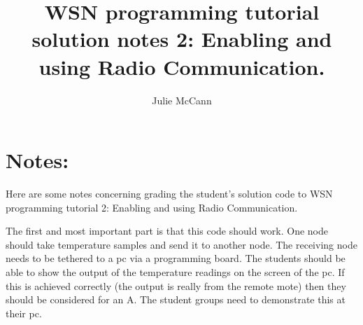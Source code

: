 \documentclass [a4] {article}
\author{Julie McCann}
\title{WSN programming tutorial solution notes 2: Enabling and using Radio Communication.}
\begin{document}
\maketitle

\section{Notes:}

Here are some notes concerning grading the student's solution code to WSN programming tutorial 2: Enabling and using Radio Communication. 

The first and most important part is that this code should work. One node should take temperature samples and send it to another node. The receiving node needs to be tethered to a pc via a programming board. The students should be able to show the output of the temperature readings on the screen of the pc. If this is achieved correctly (the output is really from the remote mote) then they should be considered for an A. The student groups need to demonstrate this at their pc.
\end{document}

